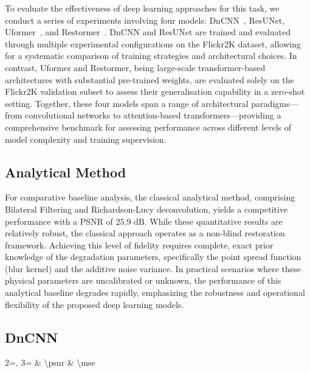 \documentclass[conference]{IEEEtran}
\begin{document}
To evaluate the effectiveness of deep learning approaches for this task, we
conduct a series of experiments involving four models: DnCNN~\cite{beyond_a_gaussian},
ResUNet, Uformer~\cite{Uformer}, and Restormer~\cite{Restormer}.
DnCNN and ResUNet are trained and evaluated through multiple experimental
configurations on the Flickr2K dataset, allowing for a
systematic comparison of training strategies and architectural choices. In
contrast, Uformer and Restormer, being large-scale transformer-based
architectures with substantial pre-trained weights, are evaluated solely on the
Flickr2K validation subset to assess their generalisation capability in a
zero-shot setting. Together, these four models span a range of architectural
paradigms—from convolutional networks to attention-based transformers—providing
a comprehensive benchmark for assessing performance across different levels of
model complexity and training supervision.

\subsection{Analytical Method}

For comparative baseline analysis, the classical analytical method,
comprising Bilateral Filtering and Richardson-Lucy deconvolution,
yields a competitive performance with a PSNR of $25.9\text{ dB}$.
While these quantitative results are relatively robust,
the classical approach operates as a non-blind restoration framework.
Achieving this level of fidelity requires complete, exact prior knowledge of the degradation parameters,
specifically the point spread function (blur kernel) and the additive noise variance.
In practical scenarios where these physical parameters are uncalibrated or unknown,
the performance of this analytical baseline degrades rapidly,
emphasizing the robustness and operational flexibility of the proposed deep learning models.

\subsection{DnCNN}

\begin{table}[tb]
  \centering
  \caption{Average result per dataset, DNCNN model.}
  \label{tab:dncnn_results_summary}
  {2=\psnr, 3=\mse}{
  \thecsvrow &
  \num{\psnr} &
  \num[scientific-notation=true, round-precision=2]{\mse}
  }
\end{table}
\end{document}
